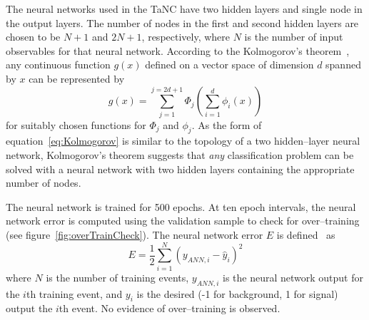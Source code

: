 The neural networks used in the TaNC have two hidden layers and single node in
the output layers.  The number of nodes in the first and second hidden layers
are chosen to be $N+1$ and $2N+1$, respectively, where $N$ is the number of
input observables for that neural network.  According to the Kolmogorov's
theorem~\cite{Kolmogorov}, any continuous function $g(x)$ defined on a vector
space of dimension $d$ spanned by $x$ can be represented by
\begin{equation}
   g(x) = \sum_{j=1}^{j=2d+1} \Phi_j \left(\sum_{i=1}^{d} \phi_i(x) \right)
   \label{eq:Kolmogorov}
\end{equation}
for suitably chosen functions for $\Phi_j$ and $\phi_j$.  As the form of
equation~\ref{eq:Kolmogorov} is similar to the topology of a two hidden--layer
neural network, Kolmogorov's theorem suggests that \emph{any} classification
problem can be solved with a neural network with two hidden layers containing
the appropriate number of nodes.

The neural network is trained for 500 epochs. At ten epoch intervals, the
neural network error is computed using the validation sample to check for
over--training (see figure~\ref{fig:overTrainCheck}). The neural network error
$E$ is defined~\cite{TMVA} as
\begin{equation}
   E = \frac{1}{2} \sum_{i=1}^N (y_{ANN,i} - \hat y_i)^2
   \label{eq:NNerrorFunc}
\end{equation}
where $N$ is the number of training events, $y_{ANN,i}$ is the neural network output
for the $i$th training event, and $y_i$ is the desired (-1 for background, 1 for signal) output
the $i$th event. No evidence  of over--training is observed.

